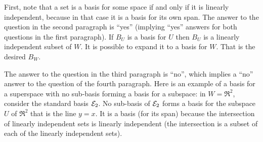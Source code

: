 \begin{Answer}
       First, note that a set is a basis for some space if and only
       if it is linearly independent, because in that case 
       it is a basis for its own span.
         \Question The answer to the question in the second paragraph
            is ``yes''
           (implying ``yes'' answers for both questions in the first
           paragraph).
           If \( B_U \) is a basis for \( U \) then
           \( B_U \) is a linearly independent subset of \( W \).
           It is possible to expand it to a basis for 
           \( W \).
           That is the desired \( B_W \).

           The answer to the question in the third paragraph is ``no'', which
           implies a ``no'' answer to the question of the fourth paragraph.
           Here is an example of a basis for a superspace with no sub-basis
           forming a basis for a subspace: in \( W=\Re^2 \), consider the
           standard basis \( {\cal E}_2 \).
           No sub-basis of ${\cal E}_2$ forms a basis for the 
           subspace \( U \) 
           of $\Re^2$ that is the line \( y=x \).
         \Question It is a basis (for its span) because the
           intersection of linearly
           independent sets is linearly independent (the intersection is a
           subset of each of the linearly independent sets).


\end{Answer}

